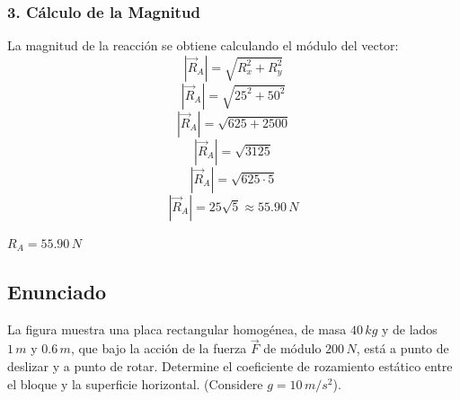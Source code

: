 \documentclass[12pt, a4paper]{article}
\begin{document}
\subsubsection*{3. Cálculo de la Magnitud}
La magnitud de la reacción se obtiene calculando el módulo del vector:
$$|\vec{R}_A| = \sqrt{R_x^2 + R_y^2}$$
$$|\vec{R}_A| = \sqrt{25^2 + 50^2}$$
$$|\vec{R}_A| = \sqrt{625 + 2500}$$
$$|\vec{R}_A| = \sqrt{3125}$$
$$|\vec{R}_A| = \sqrt{625 \cdot 5}$$
$$|\vec{R}_A| = 25\sqrt{5} \approx 55.90 \, \si{N}$$

\begin{tcolorbox}[colback=green!5!white, colframe=green!50!black, title=Respuesta Final]
\centering \Large $R_A = 55.90 \, \si{N}$
\end{tcolorbox}

\newpage

\subsection*{Enunciado}
La figura muestra una placa rectangular homogénea, de masa $40 \, \si{kg}$ y de lados $1 \, \si{m}$ y $0.6 \, \si{m}$, que bajo la acción de la fuerza $\vec{F}$ de módulo $200 \, \si{N}$, está a punto de deslizar y a punto de rotar. Determine el coeficiente de rozamiento estático entre el bloque y la superficie horizontal. (Considere $g=10\,\si{m/s^2}$).

\begin{center}
\end{center}
\end{document}
